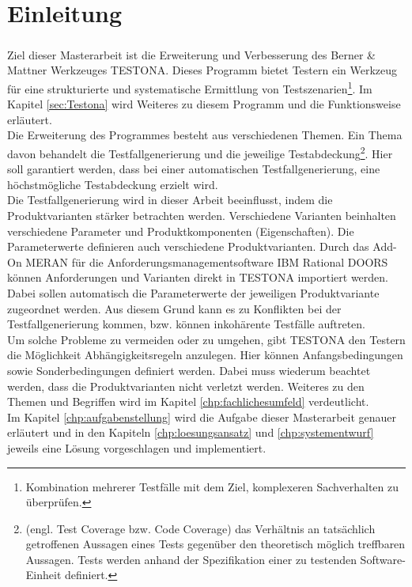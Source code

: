 \chapter{Einleitung}\label{chp:einleitung}
\paragraph{}
Ziel dieser Masterarbeit ist die Erweiterung und Verbesserung des Berner \& Mattner Werkzeuges TESTONA. Dieses Programm bietet Testern ein Werkzeug für eine strukturierte und systematische Ermittlung von Testszenarien\footnote{Kombination mehrerer Testfälle mit dem Ziel, komplexeren Sachverhalten zu überprüfen.}\cite{TESTONA}. Im Kapitel \ref{sec:Testona} wird Weiteres zu diesem Programm und die Funktionsweise erläutert.\\

Die Erweiterung des Programmes besteht aus verschiedenen Themen. Ein Thema davon behandelt die Testfallgenerierung und die jeweilige Testabdeckung\footnote{(engl. Test Coverage bzw. Code Coverage) das Verhältnis an tatsächlich getroffenen Aussagen eines Tests gegenüber den theoretisch möglich treffbaren Aussagen. Tests werden anhand der Spezifikation einer zu testenden Software-Einheit definiert.\cite{TestAbdeckung}}. Hier soll garantiert werden, dass bei einer automatischen Testfallgenerierung, eine höchstmögliche Testabdeckung erzielt wird.\\

Die Testfallgenerierung wird in dieser Arbeit beeinflusst, indem die Produktvarianten stärker betrachten werden. Verschiedene Varianten beinhalten verschiedene Parameter und Produktkomponenten (Eigenschaften). Die Parameterwerte definieren auch verschiedene Produktvarianten. Durch das Add-On MERAN für die Anforderungsmanagementsoftware \glqq IBM Rational DOORS\grqq~ können Anforderungen und Varianten direkt in  TESTONA importiert werden. Dabei sollen automatisch die Parameterwerte der jeweiligen Produktvariante zugeordnet werden. Aus diesem Grund kann es zu Konflikten bei der Testfallgenerierung kommen, bzw. können inkohärente Testfälle  auftreten.\\

Um solche Probleme zu vermeiden oder zu umgehen, gibt TESTONA den Testern die Möglichkeit Abhängigkeitsregeln anzulegen. Hier können Anfangsbedingungen sowie Sonderbedingungen definiert werden. Dabei muss wiederum beachtet werden, dass die Produktvarianten nicht verletzt werden. Weiteres zu den Themen und Begriffen wird im Kapitel \ref{chp:fachlichesumfeld} verdeutlicht.\\

Im Kapitel \ref{chp:aufgabenstellung} wird die Aufgabe dieser Masterarbeit genauer erläutert und in den Kapiteln \ref{chp:loesungsansatz} und \ref{chp:systementwurf} jeweils eine Lösung vorgeschlagen und implementiert.

